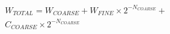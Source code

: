 \begin{equation}
    \label{eq:vernier-word-calculation}
    \begin{split} %
        W_{TOTAL} = W_{COARSE} + W_{FINE} \times 2^{-N_{COARSE}} +
        \\
        C_{COARSE} \times 2^{-N_{COARSE}}
    \end{split}
\end{equation}
